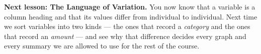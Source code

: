 \documentclass[10pt]{article}
\begin{document}
\vspace{0.10in}

\boxguard[10]
\begin{spiralbox}
\small
\textbf{Next lesson: The Language of Variation.} You now know that a variable is a column
heading and that its values differ from individual to individual. Next time we sort variables
into two kinds --- the ones that record a \emph{category} and the ones that record an
\emph{amount} --- and see why that difference decides every graph and every summary we are
allowed to use for the rest of the course.
\end{spiralbox}
\end{document}
